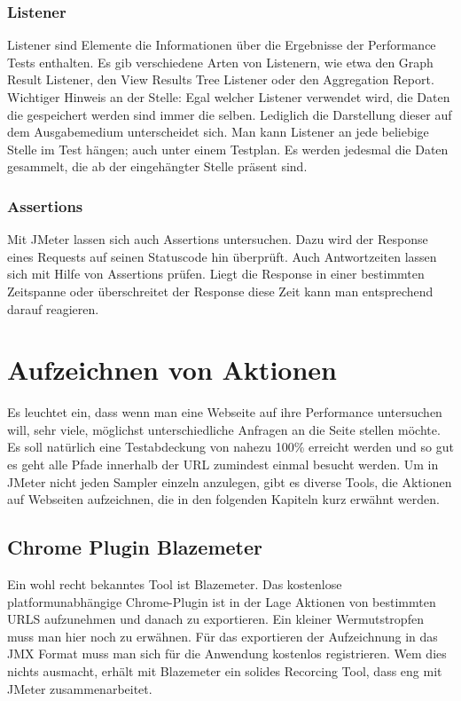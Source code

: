 \documentclass[a4paper,12pt]{article}
\begin{document}
\subsubsection{Listener}
Listener sind Elemente die Informationen über die Ergebnisse der Performance Tests enthalten. Es gib verschiedene Arten von Listenern, wie etwa den Graph Result Listener, den View Results Tree Listener oder den Aggregation Report. Wichtiger Hinweis an der Stelle: Egal welcher Listener verwendet wird, die Daten die gespeichert werden sind immer die selben. Lediglich die Darstellung dieser auf dem Ausgabemedium unterscheidet sich. Man kann Listener an jede beliebige Stelle im Test hängen; auch unter einem Testplan. Es werden jedesmal die Daten gesammelt, die ab der eingehängter Stelle präsent sind.

\subsubsection{Assertions}
Mit JMeter lassen sich auch Assertions untersuchen. Dazu wird der Response eines Requests auf seinen Statuscode hin überprüft. Auch Antwortzeiten lassen sich mit Hilfe von Assertions prüfen. Liegt die Response in einer bestimmten Zeitspanne oder überschreitet der Response diese Zeit kann man entsprechend darauf reagieren.  

\section{Aufzeichnen von Aktionen}
Es leuchtet ein, dass wenn man eine Webseite auf ihre Performance untersuchen will, sehr viele, möglichst unterschiedliche Anfragen an die Seite stellen möchte. Es soll natürlich eine Testabdeckung von nahezu 100\% erreicht werden und so gut es geht alle Pfade innerhalb der URL zumindest einmal besucht werden. Um in JMeter nicht jeden Sampler einzeln anzulegen, gibt es diverse Tools, die Aktionen auf Webseiten aufzeichnen, die in den folgenden Kapiteln kurz erwähnt werden.  

\subsection{Chrome Plugin Blazemeter}
Ein wohl recht bekanntes Tool ist Blazemeter. Das kostenlose platformunabhängige Chrome-Plugin ist in der Lage Aktionen von bestimmten URLS aufzunehmen und danach zu exportieren. Ein kleiner Wermutstropfen muss man hier noch zu erwähnen. Für das exportieren der Aufzeichnung in das JMX Format muss man sich für die Anwendung kostenlos registrieren. Wem dies nichts ausmacht, erhält mit Blazemeter ein solides Recorcing Tool, dass eng mit JMeter zusammenarbeitet. 
\end{document}
